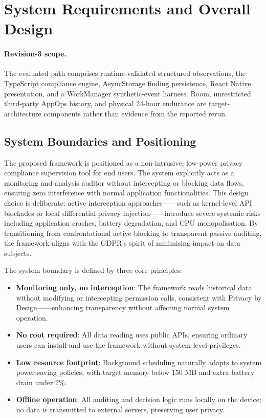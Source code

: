 \newpage
\section{System Requirements and Overall Design}

\paragraph{Revision-3 scope.} The evaluated path comprises runtime-validated structured observations, the TypeScript compliance engine, AsyncStorage finding persistence, React Native presentation, and a WorkManager synthetic-event harness. Room, unrestricted third-party AppOps history, and physical 24-hour endurance are target-architecture components rather than evidence from the reported rerun.

\subsection{System Boundaries and Positioning}

The proposed framework is positioned as a non-intrusive, low-power privacy compliance supervision tool for end users. The system explicitly acts as a monitoring and analysis auditor without intercepting or blocking data flows, ensuring zero interference with normal application functionalities. This design choice is deliberate: active interception approaches——such as kernel-level API blockades or local differential privacy injection——introduce severe systemic risks including application crashes, battery degradation, and CPU monopolisation. By transitioning from confrontational active blocking to transparent passive auditing, the framework aligns with the GDPR's spirit of minimising impact on data subjects.

The system boundary is defined by three core principles:

\begin{itemize}
\item \textbf{Monitoring only, no interception}: The framework reads historical data without modifying or intercepting permission calls, consistent with Privacy by Design——enhancing transparency without affecting normal system operation.
\item \textbf{No root required}: All data reading uses public APIs, ensuring ordinary users can install and use the framework without system-level privileges.
\item \textbf{Low resource footprint}: Background scheduling naturally adapts to system power-saving policies, with target memory below 150 MB and extra battery drain under 2\%.
\item \textbf{Offline operation}: All auditing and decision logic runs locally on the device; no data is transmitted to external servers, preserving user privacy.
\end{itemize}

